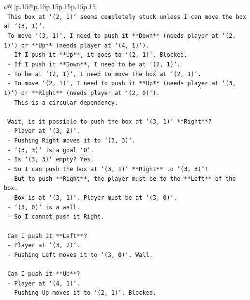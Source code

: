 \documentclass{article}
\begin{document}
{\begin{supertabular}{c@{$\;$}|p{.15\linewidth}@{}p{.15\linewidth}p{.15\linewidth}p{.15\linewidth}p{.15\linewidth}p{.15\linewidth}}
{{{\\ 
\texttt{   This box at `(2, 1)` seems completely stuck unless I can move the box at `(3, 1)`.} \\
\texttt{   To move `(3, 1)`, I need to push it **Down** (needs player at `(2, 1)`) or **Up** (needs player at `(4, 1)`).} \\
\texttt{   {-} If I push it **Up**, it goes to `(2, 1)`. Blocked.} \\
\texttt{   {-} If I push it **Down**, I need to be at `(2, 1)`.} \\
\texttt{   {-} To be at `(2, 1)`, I need to move the box at `(2, 1)`.} \\
\texttt{   {-} To move `(2, 1)`, I need to push it **Up** (needs player at `(3, 1)`) or **Right** (needs player at `(2, 0)`).} \\
\texttt{   {-} This is a circular dependency.} \\
\\ 
\texttt{   Wait, is it possible to push the box at `(3, 1)` **Right**?} \\
\texttt{   {-} Player at `(3, 2)`.} \\
\texttt{   {-} Pushing Right moves it to `(3, 3)`.} \\
\texttt{   {-} `(3, 3)` is a goal `O`.} \\
\texttt{   {-} Is `(3, 3)` empty? Yes.} \\
\texttt{   {-} So I can push the box at `(3, 1)` **Right** to `(3, 3)`!} \\
\texttt{   {-} But to push **Right**, the player must be to the **Left** of the box.} \\
\texttt{   {-} Box is at `(3, 1)`. Player must be at `(3, 0)`.} \\
\texttt{   {-} `(3, 0)` is a wall.} \\
\texttt{   {-} So I cannot push it Right.} \\
\\ 
\texttt{   Can I push it **Left**?} \\
\texttt{   {-} Player at `(3, 2)`.} \\
\texttt{   {-} Pushing Left moves it to `(3, 0)`. Wall.} \\
\\ 
\texttt{   Can I push it **Up**?} \\
\texttt{   {-} Player at `(4, 1)`.} \\
\texttt{   {-} Pushing Up moves it to `(2, 1)`. Blocked.} \\
\\ 
}}}
\end{supertabular}}
\end{document}
